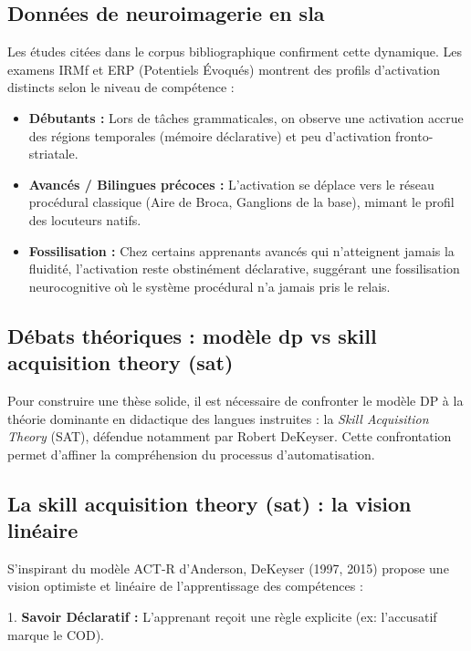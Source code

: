 \subsection{Données de neuroimagerie en sla}

Les études citées dans le corpus bibliographique confirment cette dynamique. Les examens IRMf et ERP
(Potentiels Évoqués) montrent des profils d'activation distincts selon le niveau de compétence :

\begin{itemize}\item \textbf{Débutants :} Lors de tâches grammaticales, on observe une activation accrue des régions temporales (mémoire déclarative) et peu d'activation fronto-striatale.\item \textbf{Avancés / Bilingues précoces :} L'activation se déplace vers le réseau procédural classique (Aire de Broca, Ganglions de la base), mimant le profil des locuteurs natifs.\item \textbf{Fossilisation :} Chez certains apprenants avancés qui n'atteignent jamais la fluidité, l'activation reste obstinément déclarative, suggérant une \og fossilisation\fg{} neurocognitive où le système procédural n'a jamais pris le relais.\end{itemize}

\subsection{Débats théoriques : modèle dp vs skill acquisition theory (sat)}

Pour construire une thèse solide, il est nécessaire de confronter le modèle DP à la théorie
dominante en didactique des langues instruites : la \textit{Skill Acquisition Theory} (SAT),
défendue notamment par Robert DeKeyser. Cette confrontation permet d'affiner la compréhension du
processus d'automatisation.



\subsection{La skill acquisition theory (sat) : la vision linéaire}

S'inspirant du modèle ACT-R d'Anderson, DeKeyser (1997, 2015) propose une vision optimiste et
linéaire de l'apprentissage des compétences :

1. \textbf{Savoir Déclaratif :} L'apprenant reçoit une règle explicite (ex: \og l'accusatif marque
le COD\fg{}).

